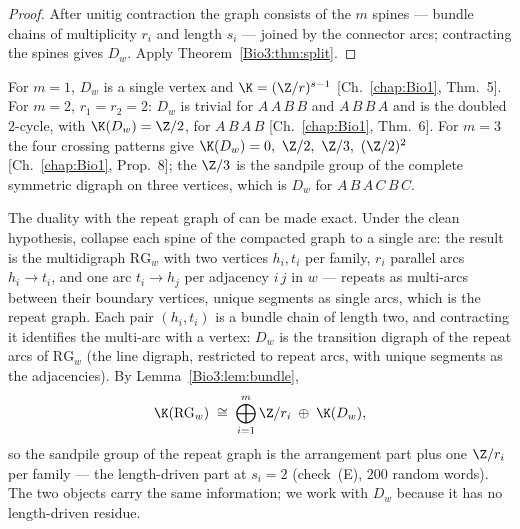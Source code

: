 \begin{proof}
After unitig contraction the graph consists of the $m$ spines --- bundle chains of
multiplicity $r_i$ and length $s_i$ --- joined by the connector arcs; contracting the
spines gives $D_w$. Apply Theorem~\ref{Bio3:thm:split}.
\end{proof}

\begin{corollary}\label{Bio3:cor:cases}
For $m=1$, $D_w$ is a single vertex and $\K=(\Z/r)^{s-1}$ [Ch.~\ref{chap:Bio1}, Thm.~5]. For $m=2$,
$r_1=r_2=2$: $D_w$ is trivial for $A\,A\,B\,B$ and $A\,B\,B\,A$ and is the doubled
$2$-cycle, with $\K(D_w)=\Z/2$, for $A\,B\,A\,B$ [Ch.~\ref{chap:Bio1}, Thm.~6]. For $m=3$ the four
crossing patterns give $\K(D_w)=0,\ \Z/2,\ \Z/3,\ (\Z/2)^{2}$ [Ch.~\ref{chap:Bio1}, Prop.~8]; the
$\Z/3$ is the sandpile group of the complete symmetric digraph on three vertices, which is
$D_w$ for $A\,B\,A\,C\,B\,C$.
\end{corollary}

\begin{remark}\label{Bio3:rem:rg}
The duality with the repeat graph of \cite{PTT,Flye} can be made exact. Under the clean
hypothesis, collapse each spine of the compacted graph to a single arc: the result is the
multidigraph $\mathrm{RG}_w$ with two vertices $h_i,t_i$ per family, $r_i$ parallel arcs
$h_i\to t_i$, and one arc $t_i\to h_j$ per adjacency $i\,j$ in $w$ --- repeats as
multi-arcs between their boundary vertices, unique segments as single arcs, which is the
repeat graph. Each pair $(h_i,t_i)$ is a bundle chain of length two, and contracting it
identifies the multi-arc with a vertex: $D_w$ is the transition digraph of the repeat
arcs of $\mathrm{RG}_w$ (the line digraph, restricted to repeat arcs, with unique
segments as the adjacencies). By Lemma~\ref{Bio3:lem:bundle},
\[
\K(\mathrm{RG}_w)\;\cong\;\bigoplus_{i=1}^{m}\Z/r_i\;\oplus\;\K(D_w),
\]
so the sandpile group of the repeat graph is the arrangement part plus one $\Z/r_i$ per
family --- the length-driven part at $s_i=2$ (check~(E), $200$ random words). The two
objects carry the same information; we work with $D_w$ because it has no length-driven
residue.
\end{remark}

